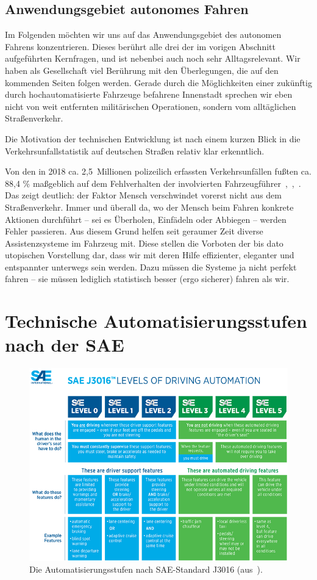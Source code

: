 \documentclass[twocolumn, german]{tum-article}
\begin{document}
\subsection{Anwendungsgebiet autonomes Fahren}
Im Folgenden möchten wir uns auf das Anwendungsgebiet des autonomen Fahrens konzentrieren.
Dieses berührt alle drei der im vorigen Abschnitt aufgeführten Kernfragen, und ist nebenbei auch noch sehr Alltagsrelevant.
Wir haben als Gesellschaft viel Berührung mit den Überlegungen, die auf den kommenden Seiten folgen werden.
Gerade durch die Möglichkeiten einer zukünftig durch hochautomatisierte Fahrzeuge befahrene Innenstadt sprechen wir eben nicht von weit entfernten militärischen Operationen, sondern vom alltäglichen Straßenverkehr.

Die Motivation der technischen Entwicklung ist nach einem kurzen Blick in die Verkehrsunfallstatistik auf deutschen Straßen relativ klar erkenntlich.

Von den in 2018 ca. 2,5~Millionen polizeilich erfassten Verkehrsunfällen fußten ca. 88,4 \% maßgeblich auf dem Fehlverhalten der involvierten Fahrzeugführer~\cite{kba-zulass},~\cite{destatis-grafik},~\cite{destatis-unfallaktuell}.
Das zeigt deutlich: der Faktor Mensch verschwindet vorerst nicht aus dem Straßenverkehr.
Immer und überall da, wo der Mensch beim Fahren konkrete Aktionen durchführt -- sei es Überholen, Einfädeln oder Abbiegen -- werden Fehler passieren.
Aus diesem Grund helfen seit geraumer Zeit diverse Assistenzsysteme im Fahrzeug mit.
Diese stellen die Vorboten der bis dato utopischen Vorstellung dar, dass wir mit deren Hilfe effizienter, eleganter und entspannter unterwegs sein werden.
Dazu müssen die Systeme ja nicht perfekt fahren -- sie müssen lediglich statistisch besser (ergo sicherer) fahren als wir.


\section{Technische Automatisierungsstufen nach der SAE}
\begin{figure}
	\includegraphics[width=\textwidth]{media/sae-levels-image}
	\caption{Die Automatisierungsstufen nach SAE-Standard J3016 (aus~\cite{sae-levels-image}).}
	\label{fig:sae-levels-img}
\end{figure}
\end{document}
